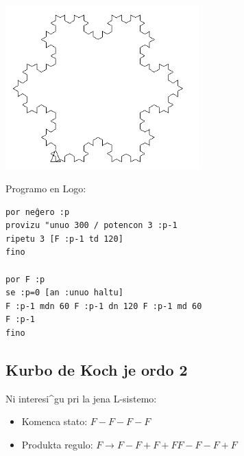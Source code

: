\begin{center}
\begin{minipage}{7.5cm}
\end{minipage}
\begin{minipage}{7.5cm}
 \includegraphics[width=7.5cm]{bildoj/linden-flocon4.png}
\end{minipage}
\end{center}
Programo en Logo:
\begin{verbatim}
por neĝero :p
provizu "unuo 300 / potencon 3 :p-1
ripetu 3 [F :p-1 td 120]  
fino

por F :p
se :p=0 [an :unuo haltu]
F :p-1 mdn 60 F :p-1 dn 120 F :p-1 md 60
F :p-1 
fino
\end{verbatim}

\subsection{Kurbo de Koch je ordo 2}
Ni interesi^gu pri la jena L-sistemo:
\begin{itemize}
 \item[\textbullet] Komenca stato: $F-F-F-F$
 \item[\textbullet] Produkta regulo: $F\rightarrow F-F+F+FF-F-F+F$
\end{itemize}

